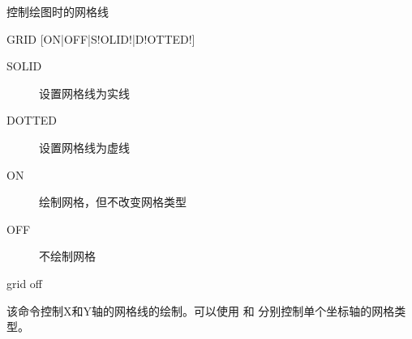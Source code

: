 \label{cmd:grid}

控制绘图时的网格线

\begin{SACSTX}
GRID [ON|OFF|S!OLID!|D!OTTED!]
\end{SACSTX}

\begin{description}
\item [SOLID] 设置网格线为实线
\item [DOTTED] 设置网格线为虚线
\item [ON] 绘制网格，但不改变网格类型
\item [OFF] 不绘制网格
\end{description}

\begin{SACDFT}
grid off
\end{SACDFT}

该命令控制X和Y轴的网格线的绘制。可以使用  和
 分别控制单个坐标轴的网格类型。
